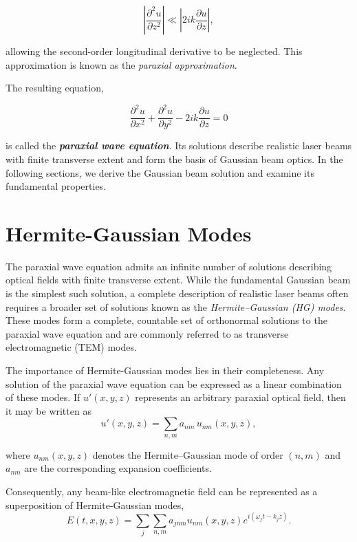 \documentclass{report}
\begin{document}
\begin{equation}
\left|
\frac{\partial^2 u}{\partial z^2}
\right|
\ll
\left|
2ik\frac{\partial u}{\partial z}
\right|,
\end{equation}

allowing the second-order longitudinal derivative to be neglected. This approximation is known as the \textit{paraxial approximation}.

The resulting equation,

\begin{equation}
\boxed{\frac{\partial^2 u}{\partial x^2}
+
\frac{\partial^2 u}{\partial y^2}
-
2ik\frac{\partial u}{\partial z}
=
0}
\end{equation}

is called the \textit{\textbf{paraxial wave equation}}. Its solutions describe realistic laser beams with finite transverse extent and form the basis of Gaussian beam optics. In the following sections, we derive the Gaussian beam solution and examine its fundamental properties.

\section{Hermite-Gaussian Modes}

The paraxial wave equation admits an infinite number of solutions describing optical fields with finite transverse extent. While the fundamental Gaussian beam is the simplest such solution, a complete description of realistic laser beams often requires a broader set of solutions known as the \textit{Hermite--Gaussian (HG) modes}. These modes form a complete, countable set of orthonormal solutions to the paraxial wave equation and are commonly referred to as transverse electromagnetic (TEM) modes.

The importance of Hermite-Gaussian modes lies in their completeness. Any solution of the paraxial wave equation can be expressed as a linear combination of these modes. If $u'(x,y,z)$ represents an arbitrary paraxial optical field, then it may be written as
\begin{equation}
u'(x,y,z)
=
\sum_{n,m}
a_{nm}\,u_{nm}(x,y,z),
\end{equation}

where $u_{nm}(x,y,z)$ denotes the Hermite--Gaussian mode of order $(n,m)$ and $a_{nm}$ are the corresponding expansion coefficients.

Consequently, any beam-like electromagnetic field can be represented as a superposition of Hermite-Gaussian modes,
\begin{equation}
E(t,x,y,z)
=
\sum_j
\sum_{n,m}
a_{jnm}
u_{nm}(x,y,z)
e^{i(\omega_j t-k_j z)}.
\end{equation}
\end{document}
